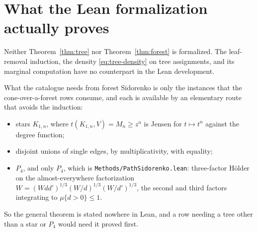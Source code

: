 \documentclass[11pt]{article}
\begin{document}
\normalsize

\appendix
\section{What the Lean formalization actually proves}

Neither Theorem~\ref{thm:tree} nor Theorem~\ref{thm:forest} is formalized.  The
leaf-removal induction, the density \eqref{eq:tree-density} on tree
assignments, and its marginal computation have no counterpart in the Lean
development.

What the catalogue needs from forest Sidorenko is only the instances that the
cone-over-a-forest rows consume, and each is available by an elementary route
that avoids the induction:

\begin{itemize}
\item stars $K_{1,n}$, where $t(K_{1,n},V)=M_n\geq z^n$ is Jensen for
 $t\mapsto t^n$ against the degree function;
\item disjoint unions of single edges, by multiplicativity, with equality;
\item $P_4$, and only $P_4$, which is
 \texttt{Methods/PathSidorenko.lean}: three-factor H\"older on the
 almost-everywhere factorization
 $W=(Wdd')^{1/3}(W/d)^{1/3}(W/d')^{1/3}$, the second and third factors
 integrating to $\mu\{d>0\}\leq1$.
\end{itemize}

So the general theorem is stated nowhere in Lean, and a row needing a tree
other than a star or $P_4$ would need it proved first.
\end{document}
